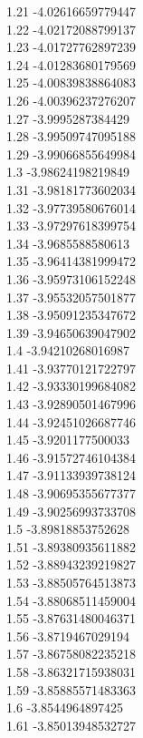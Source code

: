 {1.21	-4.02616659779447\\
1.22	-4.02172088799137\\
1.23	-4.01727762897239\\
1.24	-4.01283680179569\\
1.25	-4.00839838864083\\
1.26	-4.00396237276207\\
1.27	-3.9995287384429\\
1.28	-3.99509747095188\\
1.29	-3.99066855649984\\
1.3	-3.98624198219849\\
1.31	-3.98181773602034\\
1.32	-3.97739580676014\\
1.33	-3.97297618399754\\
1.34	-3.9685588580613\\
1.35	-3.96414381999472\\
1.36	-3.95973106152248\\
1.37	-3.95532057501877\\
1.38	-3.95091235347672\\
1.39	-3.94650639047902\\
1.4	-3.94210268016987\\
1.41	-3.93770121722797\\
1.42	-3.93330199684082\\
1.43	-3.92890501467996\\
1.44	-3.92451026687746\\
1.45	-3.9201177500033\\
1.46	-3.91572746104384\\
1.47	-3.91133939738124\\
1.48	-3.90695355677377\\
1.49	-3.90256993733708\\
1.5	-3.89818853752628\\
1.51	-3.89380935611882\\
1.52	-3.88943239219827\\
1.53	-3.88505764513873\\
1.54	-3.88068511459004\\
1.55	-3.87631480046371\\
1.56	-3.8719467029194\\
1.57	-3.86758082235218\\
1.58	-3.86321715938031\\
1.59	-3.85885571483363\\
1.6	-3.8544964897425\\
1.61	-3.85013948532727\\
}
